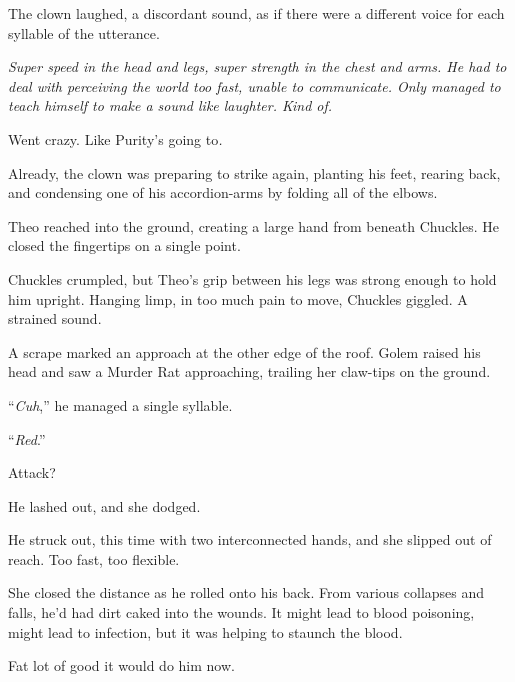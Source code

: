 The clown laughed, a discordant sound, as if there were a different voice for each syllable of the utterance.



\emph{Super speed in the head and legs, super strength in the chest and arms.  He had to deal with perceiving the world too fast, unable to communicate.  Only managed to teach himself to make a sound like laughter.  Kind of.}



Went crazy.  Like Purity's going to\emph{.}



Already, the clown was preparing to strike again, planting his feet, rearing back, and condensing one of his accordion-arms by folding all of the elbows.



Theo reached into the ground, creating a large hand from beneath Chuckles.  He closed the fingertips on a single point.



Chuckles crumpled, but Theo's grip between his legs was strong enough to hold him upright.  Hanging limp, in too much pain to move, Chuckles giggled.  A strained sound.



A scrape marked an approach at the other edge of the roof.  Golem raised his head and saw a Murder Rat approaching, trailing her claw-tips on the ground.



``\emph{Cuh},'' he managed a single syllable.



``\emph{Red}.''



Attack?



He lashed out, and she dodged.



He struck out, this time with two interconnected hands, and she slipped out of reach.  Too fast, too flexible.



She closed the distance as he rolled onto his back.  From various collapses and falls, he'd had dirt caked into the wounds.  It might lead to blood poisoning, might lead to infection, but it was helping to staunch the blood.



Fat lot of good it would do him now.



